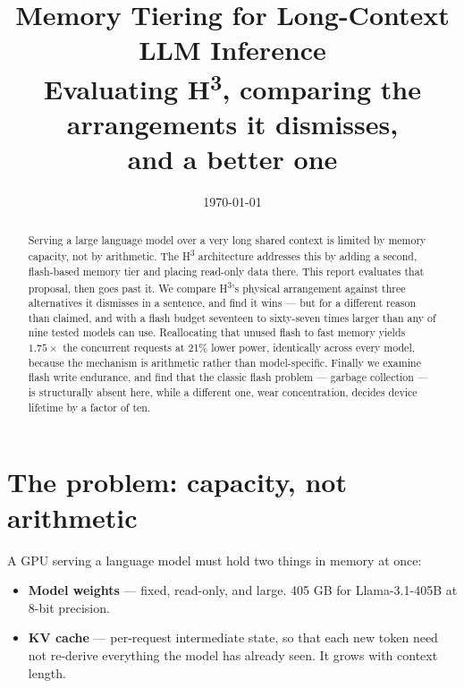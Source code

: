 \documentclass[11pt,a4paper]{article}
\title{\textbf{Memory Tiering for Long-Context LLM Inference}\\[5pt]
  \large Evaluating H\textsuperscript{3}, comparing the arrangements it
  dismisses,\\ and a better one}
\author{}
\date{\today}
\begin{document}
\maketitle
\vspace{-2em}

\begin{abstract}
\noindent
Serving a large language model over a very long shared context is limited by
memory capacity, not by arithmetic. The H\textsuperscript{3} architecture
addresses this by adding a second, flash-based memory tier and placing
read-only data there. This report evaluates that proposal, then goes past it.
We compare H\textsuperscript{3}'s physical arrangement against three
alternatives it dismisses in a sentence, and find it wins --- but for a
different reason than claimed, and with a flash budget seventeen to sixty-seven
times larger than any of nine tested models can use. Reallocating that unused
flash to fast memory yields $1.75\times$ the concurrent requests at 21\% lower
power, identically across every model, because the mechanism is arithmetic
rather than model-specific. Finally we examine flash write endurance, and find
that the classic flash problem --- garbage collection --- is structurally
absent here, while a different one, wear concentration, decides device lifetime
by a factor of ten.
\end{abstract}

\tableofcontents
\vspace{1em}

\section{The problem: capacity, not arithmetic}

A GPU serving a language model must hold two things in memory at once:

\begin{itemize}[itemsep=2pt]
  \item \textbf{Model weights} --- fixed, read-only, and large. 405 GB for
        Llama-3.1-405B at 8-bit precision.
  \item \textbf{KV cache} --- per-request intermediate state, so that each new
        token need not re-derive everything the model has already seen. It grows
        with context length.
\end{itemize}
\end{document}
